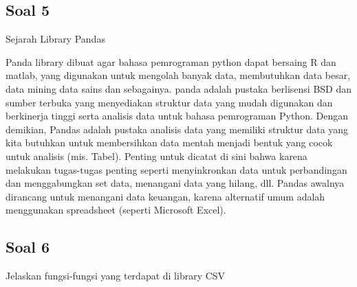 \subsection{Soal 5}
Sejarah Library Pandas

Panda library dibuat agar bahasa pemrograman python dapat bersaing R dan matlab, yang digunakan untuk mengolah banyak data, membutuhkan data besar, data mining data sains dan sebagainya.
panda adalah pustaka berlisensi BSD dan sumber terbuka yang menyediakan struktur data yang mudah digunakan dan berkinerja tinggi serta analisis data untuk bahasa pemrograman Python.
Dengan demikian, Pandas adalah pustaka analisis data yang memiliki struktur data yang kita butuhkan untuk membersihkan data mentah menjadi bentuk yang cocok untuk analisis (mis. Tabel). Penting untuk dicatat di sini bahwa karena melakukan tugas-tugas penting seperti menyinkronkan data untuk perbandingan dan menggabungkan set data, menangani data yang hilang, dll. Pandas awalnya dirancang untuk menangani data keuangan, karena alternatif umum adalah menggunakan spreadsheet (seperti Microsoft Excel).

\subsection{Soal 6}
Jelaskan fungsi-fungsi yang terdapat di library CSV

